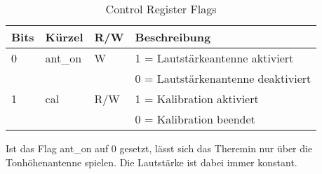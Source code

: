 \begin{table}[H]
	\centering
	\caption{Control Register Flags}
	\label{tab:Register_volume_cntrl}
	\begin{tabular}{l|l|l|l}
		\textbf{Bits} & \textbf{Kürzel} & \textbf{R/W} &	\textbf{Beschreibung}\\
		\hline \hline
		
		0 & ant\_on & W &  1 = Lautstärkeantenne aktiviert \\ 
		&      &   &  0 = Lautstärkenantenne deaktiviert \\ 
		\hline
		1 & cal & R/W &  1 = Kalibration aktiviert \\ 
		&     &     &  0 = Kalibration beendet \\ 
		\hline
	
	\end{tabular}
\end{table}

Ist das Flag ant\_on auf 0 gesetzt, lässt sich das Theremin nur über die Tonhöhenantenne spielen. Die Lautstärke ist dabei immer konstant.


